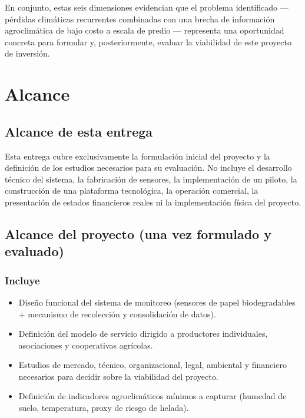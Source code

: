 \documentclass[11pt,a4paper]{article}
\begin{document}
\medskip
\noindent En conjunto, estas seis dimensiones evidencian que el problema identificado --- pérdidas climáticas recurrentes combinadas con una brecha de información agroclimática de bajo costo a escala de predio --- representa una oportunidad concreta para formular y, posteriormente, evaluar la viabilidad de este proyecto de inversión.

\section{Alcance}

\subsection{Alcance de esta entrega}
Esta entrega cubre exclusivamente la formulación inicial del proyecto y la definición de los estudios necesarios para su evaluación. No incluye el desarrollo técnico del sistema, la fabricación de sensores, la implementación de un piloto, la construcción de una plataforma tecnológica, la operación comercial, la presentación de estados financieros reales ni la implementación física del proyecto.

\subsection{Alcance del proyecto (una vez formulado y evaluado)}

\subsubsection{Incluye}
\begin{itemize}
\item Diseño funcional del sistema de monitoreo (sensores de papel biodegradables + mecanismo de recolección y consolidación de datos).
\item Definición del modelo de servicio dirigido a productores individuales, asociaciones y cooperativas agrícolas.
\item Estudios de mercado, técnico, organizacional, legal, ambiental y financiero necesarios para decidir sobre la viabilidad del proyecto.
\item Definición de indicadores agroclimáticos mínimos a capturar (humedad de suelo, temperatura, proxy de riesgo de helada).
\end{itemize}
\end{document}
